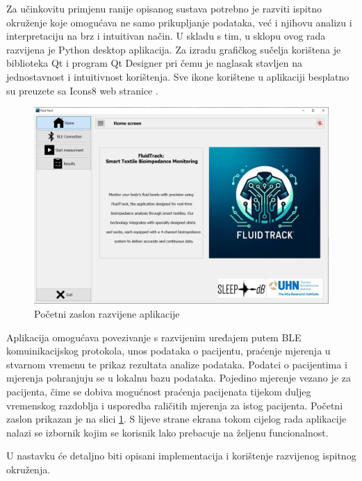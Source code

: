\documentclass[../diplomski_rad.tex]{subfiles}
\begin{document}
\sloppy

\justifying

Za učinkovitu primjenu ranije opisanog sustava potrebno je 
razviti ispitno okruženje koje omogućava ne samo prikupljanje podataka, 
već i njihovu analizu i interpretaciju na brz i intuitivan način.
U skladu s tim, u sklopu ovog rada razvijena je Python desktop aplikacija. 
Za izradu grafičkog sučelja korištena je biblioteka Qt i program Qt Designer pri čemu je 
naglasak stavljen na jednostavnost i intuitivnost korištenja.
Sve ikone korištene u aplikaciji besplatno su preuzete sa Icons8 web stranice \cite{ikone}.

\begin{figure}[htb]
    \centering
    \includegraphics[width=1\textwidth]{Figures/home.png} 
    \caption{Početni zaslon razvijene aplikacije}
    \label{slk:home}
\end{figure}

Aplikacija omogućava povezivanje s razvijenim uređajem putem BLE komuinikacijskog protokola, 
unos podataka o pacijentu,  
praćenje mjerenja u stvarnom vremenu te prikaz rezultata analize podataka. 
Podatci o pacijentima i mjerenja pohranjuju se u lokalnu bazu podataka. 
Pojedino mjerenje vezano je za pacijenta, čime se dobiva mogućnost praćenja pacijenata 
tijekom duljeg vremenskog razdoblja i usporedba raličitih mjerenja za istog pacijenta.
Početni zaslon prikazan je na slici \ref{slk:home}. 
S lijeve strane ekrana tokom cijelog rada aplikacije nalazi se izbornik kojim se korisnik lako prebacuje 
na željenu funcionalnost.  

U nastavku će detaljno biti opisani implementacija i korištenje razvijenog ispitnog okruženja.
\end{document}
